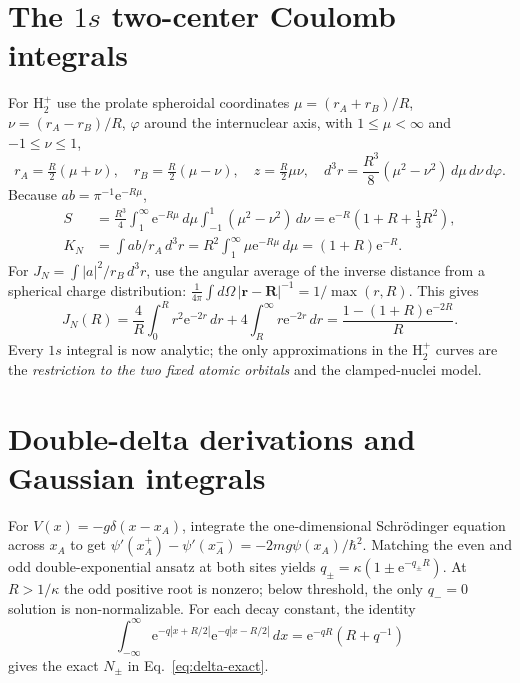 \documentclass[11pt,letterpaper]{article}
\newcommand{\e}{\mathrm e}
\begin{document}
\section{The $1s$ two-center Coulomb integrals}\label{app:1s}
For $\mathrm H_2^+$ use the prolate spheroidal coordinates $\mu=(r_A+r_B)/R$, $\nu=(r_A-r_B)/R$, $\varphi$ around the internuclear axis, with $1\le\mu<\infty$ and $-1\le\nu\le1$,
\begin{equation}\label{eq:prolate}
r_A=\tfrac R2(\mu+\nu),\quad r_B=\tfrac R2(\mu-\nu),\quad
z=\tfrac R2\mu\nu,\quad d^3r=\frac{R^3}{8}(\mu^2-\nu^2)\,d\mu\,d\nu\,d\varphi.
\end{equation}
Because $ab=\pi^{-1}\e^{-R\mu}$,
\begin{align}
S&=\frac{R^3}{4}\int_1^\infty\!\e^{-R\mu}\,d\mu\int_{-1}^1\!(\mu^2-\nu^2)\,d\nu
=\e^{-R}\left(1+R+\tfrac13R^2\right),\\
K_N&=\int ab/r_A\,d^3r
=R^2\int_1^\infty\mu\e^{-R\mu}\,d\mu=(1+R)\e^{-R}.
\end{align}
For $J_N=\int |a|^2/r_B\,d^3r$, use the angular average of the inverse distance from a spherical charge distribution: $\frac{1}{4\pi}\int d\Omega\,|\mathbf r-\mathbf R|^{-1}=1/\max(r,R)$. This gives
\begin{equation}
J_N(R)=\frac4R\int_0^R r^2\e^{-2r}\,dr+4\int_R^\infty r\e^{-2r}\,dr
=\frac{1-(1+R)\e^{-2R}}R.
\end{equation}
Every $1s$ integral is now analytic; the only approximations in the $\mathrm H_2^+$ curves are the \emph{restriction to the two fixed atomic orbitals} and the clamped-nuclei model.

\section{Double-delta derivations and Gaussian integrals}\label{app:delta}
For $V(x)=-g\delta(x-x_A)$, integrate the one-dimensional Schr\"odinger equation across $x_A$ to get $\psi'(x_A^+)-\psi'(x_A^-)=-2mg\psi(x_A)/\hbar^2$. Matching the even and odd double-exponential ansatz at both sites yields $q_\pm=\kappa(1\pm\e^{-q_\pm R})$. At $R>1/\kappa$ the odd positive root is nonzero; below threshold, the only $q_-=0$ solution is non-normalizable. For each decay constant, the identity
\begin{equation}
\int_{-\infty}^\infty\e^{-q|x+R/2|}\e^{-q|x-R/2|}\,dx
=\e^{-qR}(R+q^{-1})
\end{equation}
gives the exact $N_\pm$ in Eq.~\eqref{eq:delta-exact}.
\end{document}
